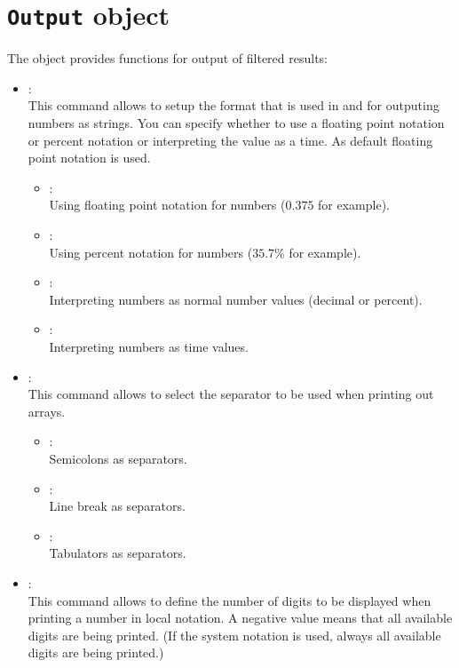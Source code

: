 \chapter{\texttt{Output} object}

The  object provides functions for output of filtered results:

\begin{itemize}

\item
{}:\\
This command allows to setup the format that is used in  and 
for outputing numbers as strings. You can specify whether to use a floating point notation or percent notation or interpreting
the value as a time. As default floating point notation is used.

\begin{itemize}
\item
{}:\\
Using floating point notation for numbers ($0.375$ for example).
\item
{}:\\
Using percent notation for numbers ($35.7\%$ for example).
\item
{}:\\
Interpreting numbers as normal number values (decimal or percent).
\item
{}:\\
Interpreting numbers as time values.
\end{itemize}

\item
{}:\\
This command allows to select the separator to be used when printing out arrays.
\begin{itemize}
\item
{}:\\
Semicolons as separators.
\item
{}:\\
Line break as separators.
\item
{}:\\
Tabulators as separators.
\end{itemize}

\item
{}:\\
This command allows to define the number of digits to be displayed when
printing a number in local notation. A negative value means that all
available digits are being printed.
(If the system notation is used, always all available digits are being printed.)


\end{itemize}

